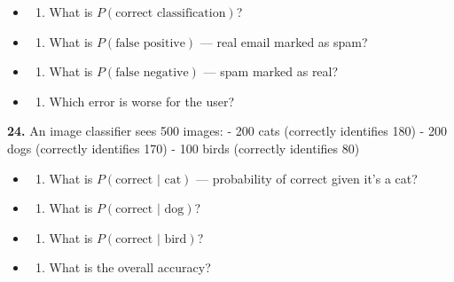 \documentclass[
  11pt,
]{article}
\providecommand{\tightlist}{%
  \setlength{\itemsep}{0pt}\setlength{\parskip}{0pt}}
\begin{document}
\begin{itemize}
\item
  \begin{enumerate}
  \def\labelenumi{(\alph{enumi})}
  \tightlist
  \item
    What is \(P(\text{correct classification})\)?
  \end{enumerate}
\item
  \begin{enumerate}
  \def\labelenumi{(\alph{enumi})}
  \setcounter{enumi}{1}
  \tightlist
  \item
    What is \(P(\text{false positive})\) --- real email marked as spam?
  \end{enumerate}
\item
  \begin{enumerate}
  \def\labelenumi{(\alph{enumi})}
  \setcounter{enumi}{2}
  \tightlist
  \item
    What is \(P(\text{false negative})\) --- spam marked as real?
  \end{enumerate}
\item
  \begin{enumerate}
  \def\labelenumi{(\alph{enumi})}
  \setcounter{enumi}{3}
  \tightlist
  \item
    Which error is worse for the user?
  \end{enumerate}
\end{itemize}

\textbf{24.} An image classifier sees 500 images: - 200 cats (correctly
identifies 180) - 200 dogs (correctly identifies 170) - 100 birds
(correctly identifies 80)

\begin{itemize}
\item
  \begin{enumerate}
  \def\labelenumi{(\alph{enumi})}
  \tightlist
  \item
    What is \(P(\text{correct | cat})\) --- probability of correct given
    it's a cat?
  \end{enumerate}
\item
  \begin{enumerate}
  \def\labelenumi{(\alph{enumi})}
  \setcounter{enumi}{1}
  \tightlist
  \item
    What is \(P(\text{correct | dog})\)?
  \end{enumerate}
\item
  \begin{enumerate}
  \def\labelenumi{(\alph{enumi})}
  \setcounter{enumi}{2}
  \tightlist
  \item
    What is \(P(\text{correct | bird})\)?
  \end{enumerate}
\item
  \begin{enumerate}
  \def\labelenumi{(\alph{enumi})}
  \setcounter{enumi}{3}
  \tightlist
  \item
    What is the overall accuracy?
  \end{enumerate}
\end{itemize}
\end{document}
